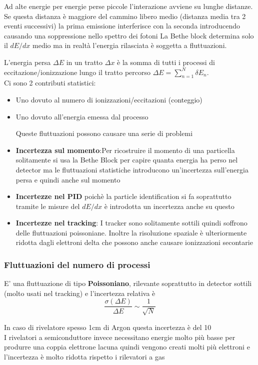   Ad alte energie per energie perse piccole l'interazione avviene su lunghe distanze. Se questa distanza è maggiore del cammino libero medio (distanza media tra 2 eventi successivi) la prima emissione interferisce con la seconda introducendo causando una soppressione nello spettro dei fotoni
La Bethe block determina solo il $dE/dx$ medio ma in realtà l'energia rilasciata è soggetta a fluttuazioni.

L'energia persa $\Delta E$ in un tratto $\Delta x$ è la somma di tutti i processi di eccitazione/ionizzazione lungo il tratto percorso $\Delta E= \sum^N_{n=1} \delta E_n$.\\
Ci sono 2 contributi statistici:
\begin{itemize}
    \item Uno dovuto al numero di ionizzazioni/eccitazioni (conteggio)
    \item Uno dovuto all'energia emessa dal processo

    Queste fluttuazioni possono causare una serie di problemi

    \item \textbf{Incertezza sul momento}:Per ricostruire il momento di una particella solitamente si usa la Bethe Block per capire quanta energia ha perso nel detector ma le fluttuazioni statistiche introducono un'incertezza sull'energia persa e quindi anche sul momento
    \item \textbf{Incertezze nel PID} poichè la particle identification si fa soprattutto tramite le misure del $dE/dx$ è introdotta un incertezza anche su questo
    \item \textbf{Incertezze nel tracking}: I tracker sono solitamente sottili quindi soffrono delle fluttuazioni poissoniane. Inoltre la risoluzione spaziale è ulteriormente ridotta dagli elettroni delta che possono anche causare ionizzazioni secontarie

\end{itemize}

\subsubsection*{Fluttuazioni del numero di processi}
E' una fluttuazione di tipo \textbf{Poissoniano}, rilevante soprattutto in detector sottili (molto usati nel tracking) e l'incertezza relativa è
\[\frac{\sigma(\Delta E)}{\Delta E}\sim\frac{1}{\sqrt{N}}\]

\begin{remark}

    In caso di rivelatore spesso 1cm di Argon questa incertezza è del 10%
\\
    I rivelatori a semiconduttore invece necessitano energie molto più basse per produrre una coppia elettrone lacuna quindi vengono creati molti più elettroni e l'incertezza è molto ridotta rispetto i rilevatori a gas

\end{remark}

